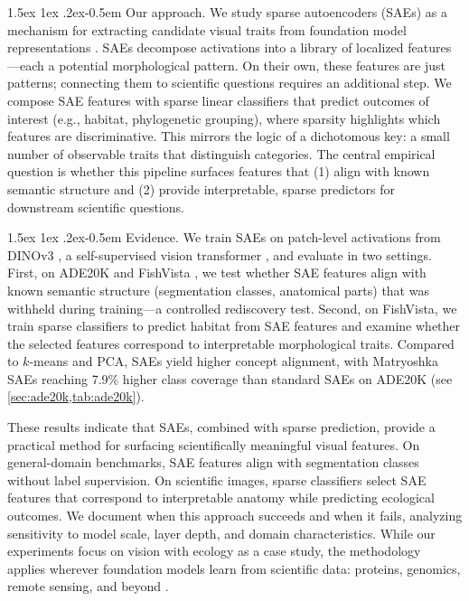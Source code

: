 \documentclass{article}
\makeatletter
\renewcommand{\paragraph}{%
  \@startsection{paragraph}{4}%
  {\z@}{1.5ex \@plus 1ex \@minus .2ex}{-0.5em}%
  {\normalfont\normalsize\bfseries}%
}
\theoremstyle{plain}
\theoremstyle{definition}
\theoremstyle{remark}
\makeatother
\begin{document}
\paragraph{Our approach.}
We study sparse autoencoders (SAEs) as a mechanism for extracting candidate visual traits from foundation model representations \citep{bricken2023monosemanticity,templeton2024scaling,cunningham2023sparse,gao2025scaling}.
SAEs decompose activations into a library of localized features—each a potential morphological pattern.
On their own, these features are just patterns; connecting them to scientific questions requires an additional step.
We compose SAE features with sparse linear classifiers that predict outcomes of interest (e.g., habitat, phylogenetic grouping), where sparsity highlights which features are discriminative.
This mirrors the logic of a dichotomous key: a small number of observable traits that distinguish categories.
The central empirical question is whether this pipeline surfaces features that (1) align with known semantic structure and (2) provide interpretable, sparse predictors for downstream scientific questions.

\paragraph{Evidence.}
We train SAEs on patch-level activations from DINOv3 \citep{simeoni2025dinov3}, a self-supervised vision transformer \citep{dosovitskiy2020vit}, and evaluate in two settings.
First, on ADE20K \citep{zhou2017ade20k} and FishVista \citep{mehrab2024fishvista,fishvistadataset}, we test whether SAE features align with known semantic structure (segmentation classes, anatomical parts) that was withheld during training—a controlled rediscovery test.
Second, on FishVista, we train sparse classifiers to predict habitat from SAE features and examine whether the selected features correspond to interpretable morphological traits.
Compared to $k$-means and PCA, SAEs yield higher concept alignment, with Matryoshka SAEs \citep{bussmann2025matryoshka} reaching \num{7.9}\% higher class coverage than standard SAEs on ADE20K (see \cref{sec:ade20k,tab:ade20k}).

These results indicate that SAEs, combined with sparse prediction, provide a practical method for surfacing scientifically meaningful visual features.
On general-domain benchmarks, SAE features align with segmentation classes without label supervision.
On scientific images, sparse classifiers select SAE features that correspond to interpretable anatomy while predicting ecological outcomes.
We document when this approach succeeds and when it fails, analyzing sensitivity to model scale, layer depth, and domain characteristics.
While our experiments focus on vision with ecology as a case study, the methodology applies wherever foundation models learn from scientific data: proteins, genomics, remote sensing, and beyond \citep{abramson2024alphafold3,lam2023graphcast,cui2024scgpt}.
\end{document}
